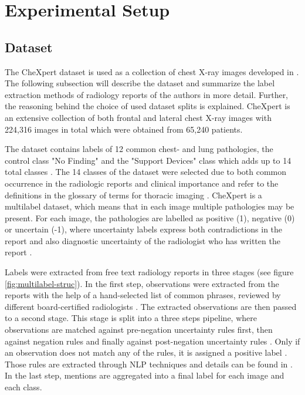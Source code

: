 \section{Experimental Setup}
\subsection{Dataset}
\label{section: dataset}
The CheXpert dataset is used as a collection of chest X-ray images developed in \citep{Irvin2019}.
The following subsection will describe the dataset and summarize the label extraction methods of radiology reports of the authors in more detail.
Further, the reasoning behind the choice of used dataset splits is explained. 
CheXpert is an extensive collection of both frontal and lateral chest X-ray images with 224,316 images in total which were obtained from 65,240 patients.
\par
The dataset contains labels of 12 common chest- and lung pathologies, the control class "No Finding" and the "Support Devices" class which adds up to 14 total classes \citep{Irvin2019}.
The 14 classes of the dataset were selected due to both common occurrence in the radiologic reports and clinical importance \citep{Irvin2019} and refer to the definitions in the glossary of terms for thoracic imaging \citep{Hansell2008}.   
CheXpert is a multilabel dataset, which means that in each image multiple pathologies may be present.
For each image, the pathologies are labelled as positive (1), negative (0) or uncertain (-1), where uncertainty labels express both contradictions in the report and also diagnostic uncertainty of the radiologist who has written the report \citep{Irvin2019}.
\par
Labels were extracted from free text radiology reports in three stages (see figure \ref{fig:multilabel-struc}).
In the first step, observations were extracted from the reports with the help of a hand-selected list of common phrases, reviewed by different board-certified radiologists \citep{Irvin2019}.
The extracted observations are then passed to a second stage.
This stage is split into a three steps pipeline, where observations are matched against pre-negation uncertainty rules first, then against negation rules and finally against post-negation uncertainty rules \citep{Irvin2019}.
Only if an observation does not match any of the rules, it is assigned a positive label \citep{Irvin2019}.
Those rules are extracted through NLP techniques and details can be found in \citep{Irvin2019}.
In the last step, mentions are aggregated into a final label for each image and each class.
